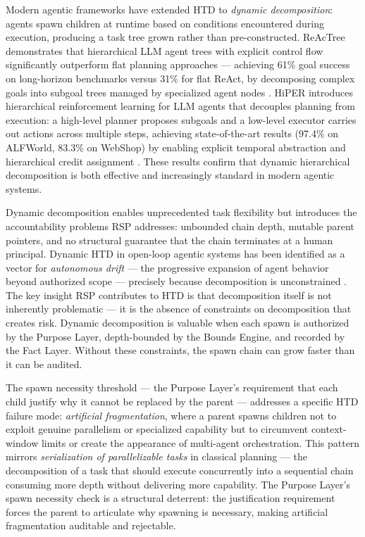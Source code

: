 Modern agentic frameworks have extended HTD to \emph{dynamic decomposition}: agents spawn children at runtime based on conditions encountered during execution, producing a task tree grown rather than pre-constructed. ReAcTree demonstrates that hierarchical LLM agent trees with explicit control flow significantly outperform flat planning approaches --- achieving 61\% goal success on long-horizon benchmarks versus 31\% for flat ReAct, by decomposing complex goals into subgoal trees managed by specialized agent nodes \cite{reactree2025}. HiPER introduces hierarchical reinforcement learning for LLM agents that decouples planning from execution: a high-level planner proposes subgoals and a low-level executor carries out actions across multiple steps, achieving state-of-the-art results (97.4\% on ALFWorld, 83.3\% on WebShop) by enabling explicit temporal abstraction and hierarchical credit assignment \cite{hiper2025}. These results confirm that dynamic hierarchical decomposition is both effective and increasingly standard in modern agentic systems.

Dynamic decomposition enables unprecedented task flexibility but introduces the accountability problems RSP addresses: unbounded chain depth, mutable parent pointers, and no structural guarantee that the chain terminates at a human principal. Dynamic HTD in open-loop agentic systems has been identified as a vector for \emph{autonomous drift} --- the progressive expansion of agent behavior beyond authorized scope --- precisely because decomposition is unconstrained \cite{autoGPT2023, xu2024iSTS}. The key insight RSP contributes to HTD is that decomposition itself is not inherently problematic --- it is the absence of constraints on decomposition that creates risk. Dynamic decomposition is valuable when each spawn is authorized by the Purpose Layer, depth-bounded by the Bounds Engine, and recorded by the Fact Layer. Without these constraints, the spawn chain can grow faster than it can be audited.

The spawn necessity threshold --- the Purpose Layer's requirement that each child justify why it cannot be replaced by the parent --- addresses a specific HTD failure mode: \emph{artificial fragmentation}, where a parent spawns children not to exploit genuine parallelism or specialized capability but to circumvent context-window limits or create the appearance of multi-agent orchestration. This pattern mirrors \emph{serialization of parallelizable tasks} in classical planning --- the decomposition of a task that should execute concurrently into a sequential chain consuming more depth without delivering more capability. The Purpose Layer's spawn necessity check is a structural deterrent: the justification requirement forces the parent to articulate why spawning is necessary, making artificial fragmentation auditable and rejectable.

